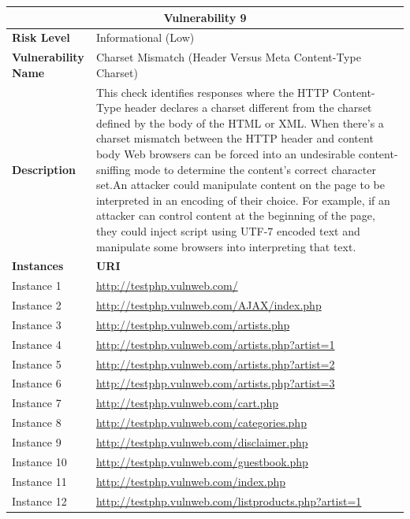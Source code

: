 \documentclass[12pt]{article}
\begin{document}
\begin{center}
\renewcommand{\arraystretch}{1.3}
\begin{longtable}{|l|p{10cm}|}
\hline
\multicolumn{2}{|c|}{\textbf{Vulnerability 9}} \\
\hline
\textbf{Risk Level} & Informational (Low) \\
\hline
\textbf{Vulnerability Name} & Charset Mismatch (Header Versus Meta Content-Type Charset) \\
\hline
\textbf{Description} & This check identifies responses where the HTTP Content-Type header declares a charset different from the charset defined by the body of the HTML or XML. When there's a charset mismatch between the HTTP header and content body Web browsers can be forced into an undesirable content-sniffing mode to determine the content's correct character set.An attacker could manipulate content on the page to be interpreted in an encoding of their choice. For example, if an attacker can control content at the beginning of the page, they could inject script using UTF-7 encoded text and manipulate some browsers into interpreting that text. \\
\hline
\textbf{Instances} & \textbf{URI} \\
\hline
Instance 1 & \url{http://testphp.vulnweb.com/} \\
\hline
Instance 2 & \url{http://testphp.vulnweb.com/AJAX/index.php} \\
\hline
Instance 3 & \url{http://testphp.vulnweb.com/artists.php} \\
\hline
Instance 4 & \url{http://testphp.vulnweb.com/artists.php?artist=1} \\
\hline
Instance 5 & \url{http://testphp.vulnweb.com/artists.php?artist=2} \\
\hline
Instance 6 & \url{http://testphp.vulnweb.com/artists.php?artist=3} \\
\hline
Instance 7 & \url{http://testphp.vulnweb.com/cart.php} \\
\hline
Instance 8 & \url{http://testphp.vulnweb.com/categories.php} \\
\hline
Instance 9 & \url{http://testphp.vulnweb.com/disclaimer.php} \\
\hline
Instance 10 & \url{http://testphp.vulnweb.com/guestbook.php} \\
\hline
Instance 11 & \url{http://testphp.vulnweb.com/index.php} \\
\hline
Instance 12 & \url{http://testphp.vulnweb.com/listproducts.php?artist=1} \\

\end{longtable}
\end{center}
\end{document}
